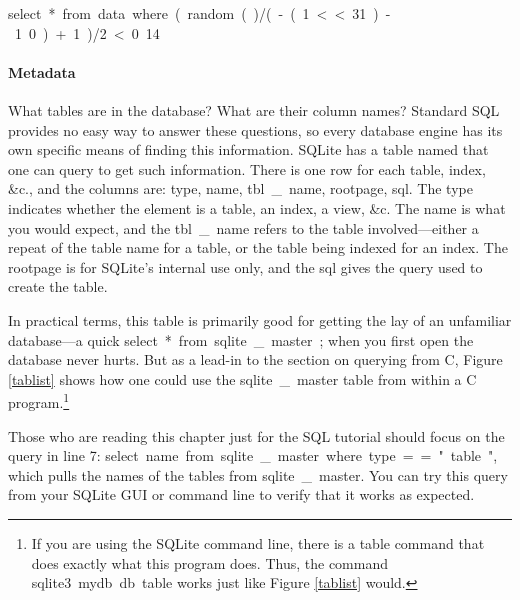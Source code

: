 \si{select * from data where (random()/(-(1<<31)-1.0)+1)/2  < 0.14}


\paragraph{Metadata} What tables are in the database? What are their
column names? Standard SQL provides no easy way to answer these questions, so every database
engine has its own specific means of finding this information. SQLite
has a table named  that one can query to get such
information. There is one row for each table, index, \&c., and the
columns are: \si{type}, \si{name},
\si{tbl\_name}, \si{rootpage}, \si{sql}.  The \si{type} indicates whether
the element is a table, an index, a view, \&c.  The \si{name} is what you
would expect, and the \si{tbl\_name} refers to the table involved---either
a repeat of the table name for a table, or the table being indexed for
an index. The \si{rootpage} is for SQLite's internal use only, and the
\si{sql} gives the query used to create the table.

In practical terms, this table is primarily good for getting the lay of
an unfamiliar database---a quick \si{select * from sqlite\_master;} 
when you first open the database never hurts.
But as a lead-in to the section on querying from C, Figure \ref{tablist}
shows how one could use the \si{sqlite\_master} table from within a C
program.\footnote{If you are using the SQLite command line, there is a
\si{.table} command that does exactly what this program does. Thus, the
command  \si{sqlite3 mydb.db .table} works just like Figure \ref{tablist}
would.}

Those who are reading this chapter just for the SQL tutorial should
focus on the query in line 7: \si{select name from sqlite\_master where
type == "table"}, which pulls the names of the tables from
\si{sqlite\_master}. You can try this query from your SQLite GUI or
command line to verify that it works as expected.


\lstset{numbers=left, numberstyle=\scshape}
 
\lstset{numbers=none}

